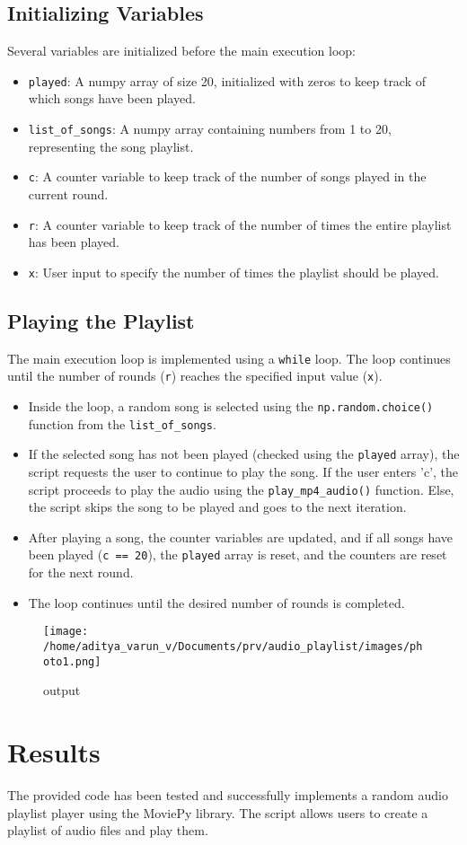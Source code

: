 \documentclass{article}
\begin{document}
\subsection{Initializing Variables}
Several variables are initialized before the main execution loop:
\begin{itemize}
  \item \texttt{played}: A numpy array of size 20, initialized with zeros to keep track of which songs have been played.
  \item \texttt{list\_of\_songs}: A numpy array containing numbers from 1 to 20, representing the song playlist.
  \item \texttt{c}: A counter variable to keep track of the number of songs played in the current round.
  \item \texttt{r}: A counter variable to keep track of the number of times the entire playlist has been played.
  \item \texttt{x}: User input to specify the number of times the playlist should be played.
\end{itemize}

\subsection{Playing the Playlist}
The main execution loop is implemented using a \texttt{while} loop. The loop continues until the number of rounds (\texttt{r}) reaches the specified input value (\texttt{x}).
\begin{itemize}
  \item Inside the loop, a random song is selected using the \texttt{np.random.choice()} function from the \texttt{list\_of\_songs}.
  \item If the selected song has not been played (checked using the \texttt{played} array), the script requests the user to continue to play the song. If the user enters 'c', the script proceeds to play the audio using the \texttt{play\_mp4\_audio()} function. Else, the script skips the song to be played and goes to the next iteration.
  \item After playing a song, the counter variables are updated, and if all songs have been played (\texttt{c == 20}), the \texttt{played} array is reset, and the counters are reset for the next round.
  \item The loop continues until the desired number of rounds is completed.
\end{itemize}

\begin{figure}[h]
 \centering
 \texttt{[image: /home/aditya\_varun\_v/Documents/prv/audio\_playlist/images/photo1.png]}
 \caption{output}
 \label{output}
\end{figure}

\section{Results}
The provided code has been tested and successfully implements a random audio playlist player using the MoviePy library. The script allows users to create a playlist of audio files and play them.
\end{document}
